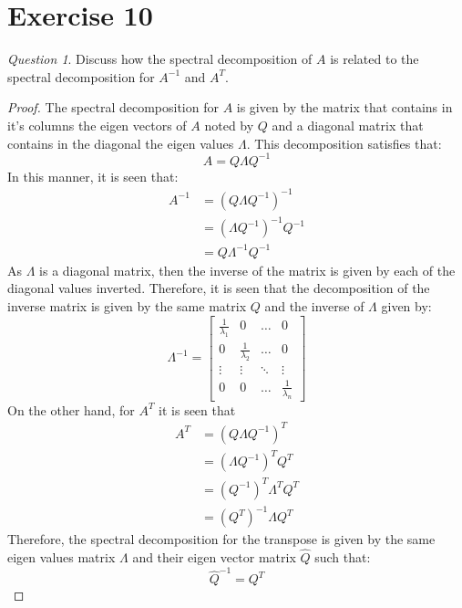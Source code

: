 \documentclass[11pt]{article}
\theoremstyle{definition}
\theoremstyle{remark}
\theoremstyle{remark}
\theoremstyle{remark}
\newtheorem*{question}{Question}
\theoremstyle{proof}
\begin{document}
\section*{Exercise 10}
\begin{question}
  Discuss how the spectral decomposition of $A$ is related to the spectral
  decomposition for $A^{-1}$ and $A^{T}$.
\end{question}

\begin{proof}
  The spectral decomposition for $A$ is given by the matrix that contains in
  it's columns the eigen vectors of $A$ noted by $Q$ and a diagonal matrix that
  contains in the diagonal the eigen values $\Lambda$. This decomposition
  satisfies that:
  \begin{equation*}
    A = Q\Lambda Q^{-1}
  \end{equation*}
  In this manner, it is seen that:
  \begin{align*}
    A^{-1} &= \left(Q \Lambda Q^{-1}\right)^{-1} \\
           &= \left(\Lambda Q^{-1}\right)^{-1} Q^{-1} \\
           &= Q \Lambda^{-1} Q^{-1}
  \end{align*}
  As $\Lambda$ is a diagonal matrix, then the inverse of the matrix is given by
  each of the diagonal values inverted. Therefore, it is seen that the
  decomposition of the inverse matrix is given by the same matrix $Q$ and the
  inverse of $\Lambda$ given by:
  \begin{equation*}
    \Lambda^{-1} =
    \begin{bmatrix}
      \frac{1}{\lambda_{1}} & 0 & \ldots & 0 \\
      0 & \frac{1}{\lambda_{2}} & \ldots & 0 \\
      \vdots & \vdots & \ddots & \vdots \\
      0 & 0 & \ldots & \frac{1}{\lambda_{n}}
    \end{bmatrix}
  \end{equation*}
  On the other hand, for $A^{T}$ it is seen that
  \begin{align*}
    A^{T} &= \left(Q \Lambda Q^{-1}\right)^{T} \\
          &= \left(\Lambda Q^{-1}\right)^{T} Q^{T} \\
          &= \left(Q^{-1}\right)^{T} \Lambda^{T} Q^{T} \\
          &= \left(Q^{T}\right)^{-1} \Lambda Q^{T}
  \end{align*}
  Therefore, the spectral decomposition for the transpose is given by the same
  eigen values matrix $\Lambda$ and their eigen vector matrix $\hat{Q}$ such
  that:
  \begin{equation*}
    \hat{Q}^{-1} = Q^{T}
  \end{equation*}
\end{proof}
\end{document}
